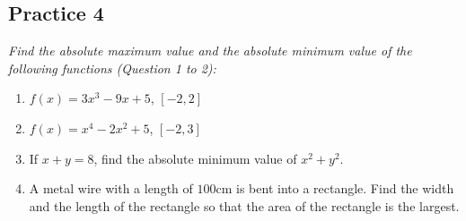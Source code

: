 \subsection{Practice 4}

\noindent \hspace{1.2em}\textit{Find the absolute maximum value and the absolute minimum value of the following functions (Question 1 to 2):}
\begin{enumerate}
    \item $f(x) = 3x^3 - 9x + 5$, $[-2, 2]$
    \item $f(x) = x^4 - 2x^2 + 5$, $[-2, 3]$
    \item If $x + y = 8$, find the absolute minimum value of $x^2 + y^2$.
    \item A metal wire with a length of $100$cm is bent into a rectangle. Find the width
          and the length of the rectangle so that the area of the rectangle is the
          largest.
\end{enumerate}